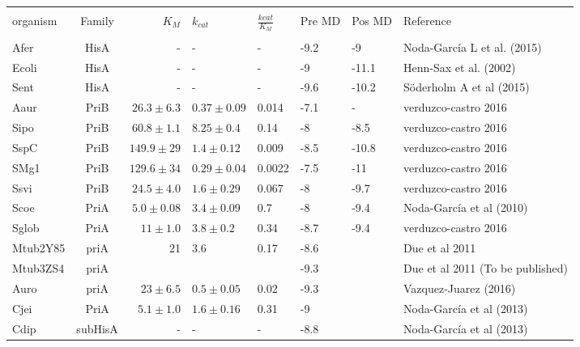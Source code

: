 \documentclass[12pt,twoside]{reedthesis}
\begin{document}
  \begin{tabular}{ l c r l l l l l}
  \hline \\ [-1.5ex]
  organism  &Family  &  $K_M$ & $k_{cat}$& $\frac{k{cat}}{K_M}$ &Pre MD &Pos MD &Reference  \\ [1ex]
  \hline \\ [-1.5ex]
  Afer      &HisA    &-            &-                &-          &-9.2    &-9        &Noda-García L et al. (2015)   \\ [1ex]
  Ecoli     &HisA    &-            &-                &-          &-9      &-11.1     &Henn-Sax et al. (2002)\\ [1ex]
  Sent      &HisA    &-            & -               &-          &-9.6    &-10.2     &Söderholm A et al (2015)\\ [1ex]
  Aaur      &PriB    &$26.3\pm6.3$ & $0.37\pm 0.09$  & 0.014     &-7.1    &-         &verduzco-castro 2016\\ [1ex]
  Sipo      &PriB    &$60.8\pm1.1$ &$8.25\pm0.4 $    &0.14       &-8      &-8.5      &verduzco-castro 2016 \\ [1ex]
  SspC      &PriB    &$149.9\pm29$ &$1.4\pm0.12 $    &0.009      &-8.5    &-10.8     &verduzco-castro 2016\\ [1ex]
  SMg1      &PriB    &$129.6\pm34$ &$0.29\pm0.04$    &0.0022     &-7.5    &-11       &verduzco-castro 2016\\ [1ex]
  Ssvi      &PriB    &$24.5\pm4.0$ &$1.6\pm0.29 $    &0.067      &-8      &-9.7      &verduzco-castro 2016 \\ [1ex]
  Scoe      &PriA    &$5.0\pm0.08$ &$3.4\pm0.09  $   &0.7        &-8      &-9.4      &Noda-García et al (2010)   \\ [1ex]
  Sglob     &PriA    &$11\pm1.0$  &$3.8\pm0.2  $     &0.34       &-8.7    &-9.4      &verduzco-castro 2016  \\ [1ex]
  Mtub2Y85  &priA    &21         &3.6         &0.17       &-8.6    &          &Due et al 2011                        \\ [1ex] 
  Mtub3ZS4  &priA    &           &            &           &-9.3    &          &Due et al 2011 (To be published)      \\ [1ex] 
  Auro      &priA    &$23 \pm 6.5 $  &$0.5\pm0.05 $&0.02       &-9.3    &          &Vazquez-Juarez (2016)                 \\ [1ex] 
  Cjei      &PriA    &$5.1 \pm1.0$  &$1.6 \pm 0.16 $&0.31       &-9      &          &Noda-García et al (2013)              \\ [1ex]
  Cdip      &subHisA &-          &-           &-          &-8.8    &          &Noda-García et al (2013)              \\ [1ex]

\end{tabular}
\end{document}
